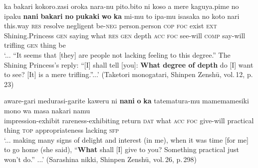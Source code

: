 \documentclass[output=paper]{LSP/langsci}
\begin{document}
\begin{exe}
\ex%
\label{07-fr-ex:54}
\gll ka bakari kokoro.zasi oroka nara-nu pito.bito ni koso a mere kaguya.pime no ipaku \textbf{nani} \textbf{bakari} \textbf{no} \textbf{pukaki} \textbf{wo} \textbf{ka} mi-mu to ipa-mu isasaka no koto nari\\
this.way \textsc{res} resolve negligent be-\textsc{neg} person.person \textsc{cop} \textsc{foc} exist \textsc{ext} Shining.Princess \textsc{gen} saying  what   \textsc{res} \textsc{gen} depth \textsc{acc} \textsc{foc}  see-will \textsc{comp} say-will trifling \textsc{gen} thing be\\
\glt ‘... “It seems that [they] are people not lacking feeling to this degree.” The Shining Princess's reply: “[I] shall tell [you]: \textbf{What degree of depth} do [I] want to see? [It] is a mere trifling.”...’  (Taketori monogatari, Shinpen Zenshū, vol.\,12, p.\,23)
\end{exe}

\begin{exe}
\ex%
\label{07-fr-ex:55}
\gll aware-gari medurasi-garite kaweru ni \textbf{nani} \textbf{o} \textbf{ka} tatematura-mu mamemamesiki mono wa masa nakari namu\\
impression-exhibit rareness-exhibiting return \textsc{dat}  what \textsc{acc}  \textsc{foc} give-will practical thing \textsc{top} appropriateness lacking \textsc{sfp}\\
\glt ‘... making many signs of delight and interest (in me), when it was time [for me] to go home (she said), “\textbf{What} shall [I] give to you? Something practical just won't do.” ...’ (Sarashina nikki, Shinpen Zenshū, vol.\,26, p.\,298)
\end{exe}
\end{document}
